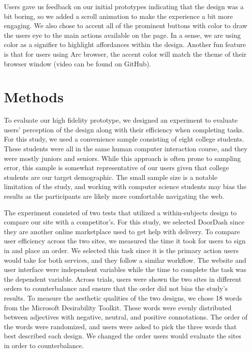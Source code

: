Users gave us feedback on our initial prototypes indicating that the design was a bit boring, so we added a scroll animation to make the experience a bit more engaging. We also chose to accent all of the prominent buttons with color to draw the users eye to the main actions available on the page. In a sense, we are using color as a signifier to highlight affordances within the design. Another fun feature is that for users using Arc browser, the accent color will match the theme of their browser window (video can be found on GitHub). 


\section{Methods}

To evaluate our high fidelity prototype, we designed an experiment to evaluate users’ perception of the design along with their efficiency when completing tasks. For this study, we used a convenience sample consisting of eight college students. These students were all in the same human computer interaction course, and they were mostly juniors and seniors. While this approach is often prone to sampling error, this sample is somewhat representative of our users given that college students are our target demographic. The small sample size is a notable limitation of the study, and working with computer science students may bias the results as the participants are likely more comfortable navigating the web. 

The experiment consisted of two tests that utilized a within-subjects design to compare our site with a competitor’s. For this study, we selected DoorDash since they are another online marketplace used to get help with delivery. To compare user efficiency across the two sites, we measured the time it took for users to sign in and place an order. We selected this task since it is the primary action users would take for both services, and they follow a similar workflow. The website and user interface were independent variables while the time to complete the task was the dependent variable. Across trials, users were shown the two sites in different orders to counterbalance and ensure that the order did not bias the study's results. To measure the aesthetic qualities of the two designs, we chose 18 words from the Microsoft Desirability Toolkit. These words were evenly distributed between adjectives with negative, neutral, and positive connotations. The order of the words were randomized, and users were asked to pick the three words that best described each design. We changed the order users would evaluate the sites in order to counterbalance. 

